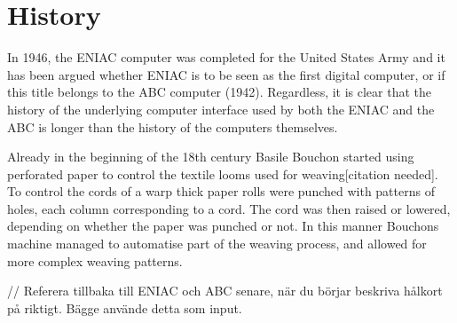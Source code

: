 \section{History}
In 1946, the ENIAC computer was completed for the United States Army and it has been argued whether ENIAC is to be seen as the first digital computer\cite{McCartney1999}, or if this title belongs to the ABC computer (1942)\cite{court}. Regardless, it is clear that the history of the underlying computer interface used by both the ENIAC and the ABC is longer than the history of the computers themselves.

Already in the beginning of the 18th century Basile Bouchon started using perforated paper to control the textile looms used for weaving[citation needed]. To control the cords of a warp thick paper rolls were punched with patterns of holes, each column corresponding to a cord. The cord was then raised or lowered, depending on whether the paper was punched or not. In this manner Bouchons machine managed to automatise part of the weaving process, and allowed for more complex weaving patterns.


// Referera tillbaka till ENIAC och ABC senare, när du börjar beskriva hålkort på riktigt. Bägge använde detta som input.


